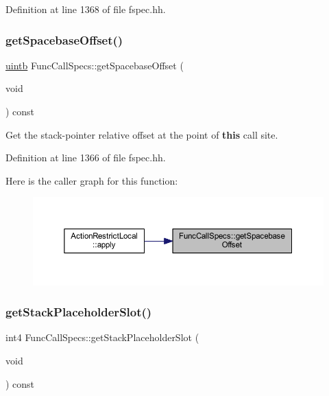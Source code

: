 Definition at line 1368 of file fspec.\+hh.

\mbox{\label{class_func_call_specs_ad8990f080a96809b347656d7331236c5}} 
\subsubsection{\texorpdfstring{getSpacebaseOffset()}{getSpacebaseOffset()}}
{\footnotesize\ttfamily \mbox{\hyperlink{types_8h_a2db313c5d32a12b01d26ac9b3bca178f}{uintb}} Func\+Call\+Specs\+::get\+Spacebase\+Offset (\begin{DoxyParamCaption}\item[{void}]{ }\end{DoxyParamCaption}) const\hspace{0.3cm}{\ttfamily [inline]}}



Get the stack-\/pointer relative offset at the point of {\bfseries{this}} call site. 



Definition at line 1366 of file fspec.\+hh.

Here is the caller graph for this function\+:
\nopagebreak
\begin{figure}[H]
\begin{center}
\leavevmode
\includegraphics[width=350pt]{class_func_call_specs_ad8990f080a96809b347656d7331236c5_icgraph}
\end{center}
\end{figure}
\mbox{\label{class_func_call_specs_abfda84c2a3919927503193ce9595efd6}} 
\subsubsection{\texorpdfstring{getStackPlaceholderSlot()}{getStackPlaceholderSlot()}}
{\footnotesize\ttfamily int4 Func\+Call\+Specs\+::get\+Stack\+Placeholder\+Slot (\begin{DoxyParamCaption}\item[{void}]{ }\end{DoxyParamCaption}) const\hspace{0.3cm}{\ttfamily [inline]}}



